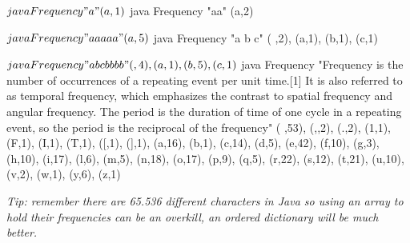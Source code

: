 \documentclass[a4paper, 11pt]{article}
\begin{document}
\begin{cmd}
$ java Frequency "a"
(a,1)

$ java Frequency "aa"
(a,2)

$ java Frequency "aaaaa"
(a,5)

$ java Frequency "a b c"
( ,2), (a,1), (b,1), (c,1)

$ java Frequency "a b c bb bb"
( ,4), (a,1), (b,5), (c,1)

$ java Frequency "Frequency is the number of occurrences of a repeating event per 
unit time.[1] It is also referred to as temporal frequency, which emphasizes the 
contrast to spatial frequency and angular frequency. The period is the duration 
of time of one cycle in a repeating event, so the period is the reciprocal of the
 frequency"
( ,53), (,,2), (.,2), (1,1), (F,1), (I,1), (T,1), ([,1), (],1), (a,16), (b,1), 
(c,14), (d,5), (e,42), (f,10), (g,3), (h,10), (i,17), (l,6), (m,5), (n,18), 
(o,17), (p,9), (q,5), (r,22), (s,12), (t,21), (u,10), (v,2), (w,1), (y,6), 
(z,1)
\end{cmd}

\textsl{Tip: remember there are 65.536 different characters in Java so using an
array to hold their frequencies can be an overkill, an ordered dictionary will
be much better.}

\end{document}
